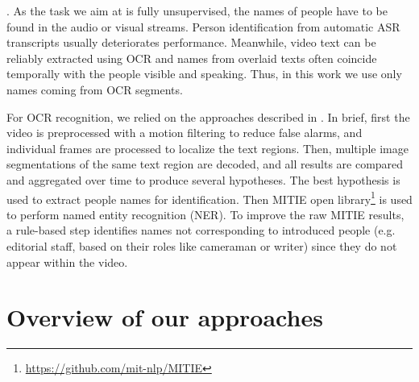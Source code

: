 . As the task we aim at is fully unsupervised, 
the names of people have to be found in the audio or visual streams.
%
%
Person identification from automatic ASR transcripts usually deteriorates performance. 
Meanwhile, video text can be reliably extracted using OCR and names from overlaid texts often coincide temporally with the people visible and speaking.
Thus, in this work we use only names coming from OCR segments.

For  OCR recognition, we relied on the approaches described in \cite{chen-pr04}.
%
In brief, first the video is preprocessed with a motion filtering to reduce false alarms, 
and individual frames are processed to localize the text regions.
%
%
Then, multiple image segmentations of the same text region are decoded, and all results are compared and 
aggregated over time to produce several hypotheses. 
%
The best hypothesis is used to extract people names for identification. Then MITIE open library\footnote{\url{https://github.com/mit-nlp/MITIE}} is used to perform named entity recognition (NER). 
%
%
To improve the raw MITIE results, a rule-based step identifies names not corresponding to introduced people (e.g. editorial staff,  
based on their roles like  cameraman or writer) since they  do not appear within the video.

\section{Overview of our approaches}
\label{sec:overview}


